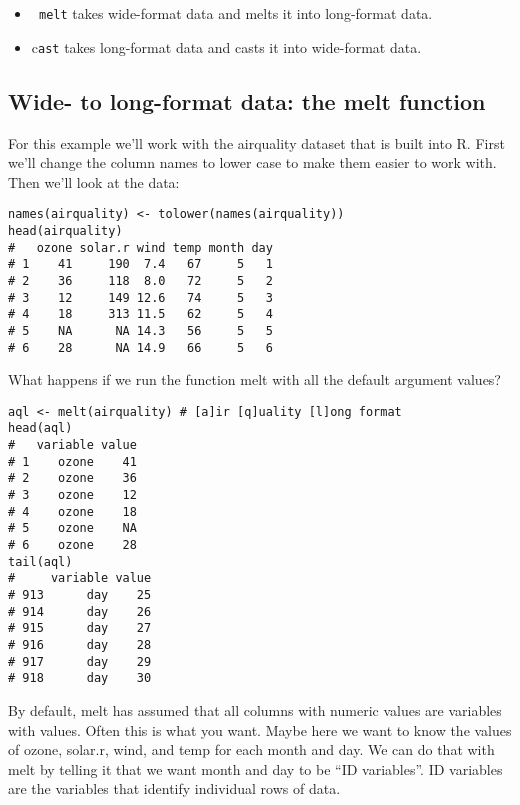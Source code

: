 \documentclass[french]{article}
\begin{document}
\begin{itemize}
\item\texttt{ melt} takes wide-format data and melts it into long-format data.

\item c\texttt{ast} takes long-format data and casts it into wide-format data.

\end{itemize}



\subsection{Wide- to long-format data: the melt function}
For this example we’ll work with the airquality dataset that is built into R. First we’ll change the column names to lower case to make them easier to work with. Then we’ll look at the data:
\begin{framed}
\begin{verbatim}
names(airquality) <- tolower(names(airquality))
head(airquality)
#   ozone solar.r wind temp month day
# 1    41     190  7.4   67     5   1
# 2    36     118  8.0   72     5   2
# 3    12     149 12.6   74     5   3
# 4    18     313 11.5   62     5   4
# 5    NA      NA 14.3   56     5   5
# 6    28      NA 14.9   66     5   6
\end{verbatim}
\end{framed}
What happens if we run the function melt with all the default argument values?
\begin{framed}
\begin{verbatim}
aql <- melt(airquality) # [a]ir [q]uality [l]ong format
head(aql)
#   variable value
# 1    ozone    41
# 2    ozone    36
# 3    ozone    12
# 4    ozone    18
# 5    ozone    NA
# 6    ozone    28
tail(aql)
#     variable value
# 913      day    25
# 914      day    26
# 915      day    27
# 916      day    28
# 917      day    29
# 918      day    30
\end{verbatim}
\end{framed}
By default, melt has assumed that all columns with numeric values are variables with values. Often this is what you want. Maybe here we want to know the values of ozone, solar.r, wind, and temp for each month and day. We can do that with melt by telling it that we want month and day to be “ID variables”. ID variables are the variables that identify individual rows of data.
\end{document}
